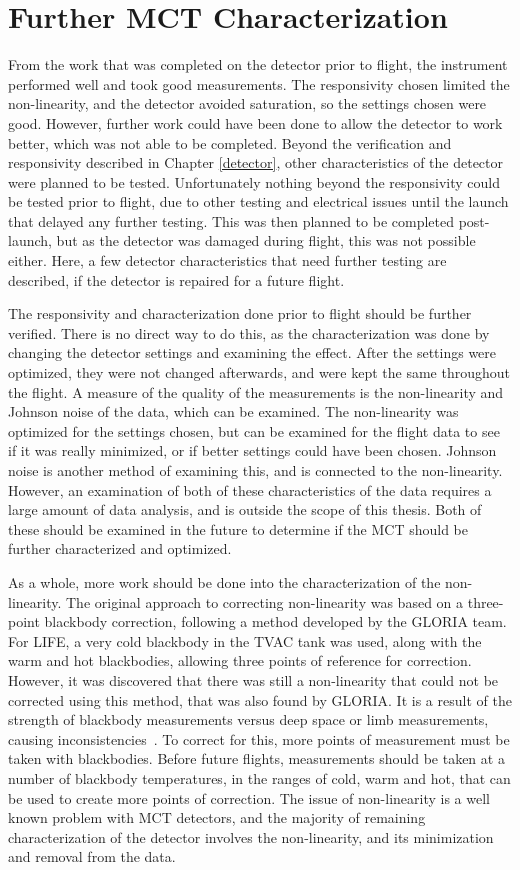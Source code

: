 \section{Further MCT Characterization}
From the work that was completed on the detector prior to flight, the instrument performed well and took good measurements. The responsivity chosen limited the non-linearity, and the detector avoided saturation, so the settings chosen were good. However, further work could have been done to allow the detector to work better, which was not able to be completed. Beyond the verification and responsivity described in Chapter \ref{detector}, other characteristics of the detector were planned to be tested. Unfortunately nothing beyond the responsivity could be tested prior to flight, due to other testing and electrical issues until the launch that delayed any further testing. This was then planned to be completed post-launch, but as the detector was damaged during flight, this was not possible either. Here, a few detector characteristics that need further testing are described, if the detector is repaired for a future flight.

The responsivity and characterization done prior to flight should be further verified. There is no direct way to do this, as the characterization was done by changing the detector settings and examining the effect. After the settings were optimized, they were not changed afterwards, and were kept the same throughout the flight. A measure of the quality of the measurements is the non-linearity and Johnson noise of the data, which can be examined. The non-linearity was optimized for the settings chosen, but can be examined for the flight data to see if it was really minimized, or if better settings could have been chosen. Johnson noise is another method of examining this, and is connected to the non-linearity. However, an examination of both of these characteristics of the data requires a large amount of data analysis, and is outside the scope of this thesis. Both of these should be examined in the future to determine if the MCT should be further characterized and optimized.

As a whole, more work should be done into the characterization of the non-linearity. The original approach to correcting non-linearity was based on a three-point blackbody correction, following a method developed by the GLORIA team. For LIFE, a very cold blackbody in the TVAC tank was used, along with the warm and hot blackbodies, allowing three points of reference for correction. However, it was discovered that there was still a non-linearity that could not be corrected using this method, that was also found by GLORIA. It is a result of the strength of blackbody measurements versus deep space or limb measurements, causing inconsistencies~\citep{GLORIA_nonlinearity_PhD}. To correct for this, more points of measurement must be taken with blackbodies. Before future flights, measurements should be taken at a number of blackbody temperatures, in the ranges of cold, warm and hot, that can be used to create more points of correction. The issue of non-linearity is a well known problem with MCT detectors, and the majority of remaining characterization of the detector involves the non-linearity, and its minimization and removal from the data.

